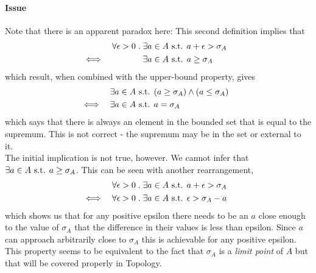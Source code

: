 \documentclass[MathsNotesBase.tex]{subfiles}
\begin{document}
{		\paragraph{Issue} Note that there is an apparent paradox here: This second definition implies that
		\begin{align*}
			&&  \forall \epsilon > 0 \;.\; \exists a \in A &\text{ s.t. } a + \epsilon > \sigma_A  \\
			&\iff &\exists a \in A &\text{ s.t. } a \geq \sigma_A  &\text{\scriptsize{}}
		\end{align*}
		which result, when combined with the upper-bound property, gives
		\begin{align*}
			&& \exists a \in A &\text{ s.t. } (a \geq \sigma_A) \wedge (a \leq \sigma_A) \\
			&\iff &\exists a \in A &\text{ s.t. } a = \sigma_A  &\text{\scriptsize{}}
		\end{align*}
		which says that there is always an element in the bounded set that is equal to the supremum. This is not correct - the supremum may be in the set or external to it.\\
		The initial implication is not true, however. We cannot infer that ${ \exists a \in A \text{ s.t. } a \geq \sigma_A }$. This can be seen with another rearrangement,
		\begin{align*}
			&&  \forall \epsilon > 0 \;.\; \exists a \in A &\text{ s.t. } a + \epsilon > \sigma_A  \\
			&\iff &\forall \epsilon > 0 \;.\; \exists a \in A &\text{ s.t. } \epsilon > \sigma_A - a  &\text{\scriptsize{}}
		\end{align*}
		which shows us that for any positive epsilon there needs to be an $a$ close enough to the value of $\sigma_A$ that the difference in their values is less than epsilon. Since $a$ can approach arbitrarily close to $\sigma_A$ this is achievable for any positive epsilon. This property seems to be equivalent to the fact that $\sigma_A$ is a \textit{limit point} of $A$ but that will be covered properly in Topology.
		\bigskip\bigskip
		
	}
\end{document}
